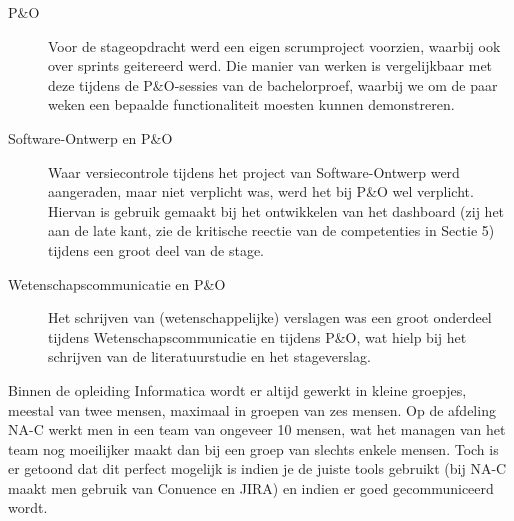 \documentclass[10pt,a4paper]{article}
\begin{document}
\begin{description}
\item[P\&O]
Voor de
stageopdracht werd een eigen scrumproject voorzien, waarbij ook over sprints
geitereerd werd. Die manier van werken is vergelijkbaar met deze tijdens de
P\&O-sessies van de bachelorproef, waarbij we om de paar weken een bepaalde
functionaliteit moesten kunnen demonstreren.

\item[Software-Ontwerp en P\&O]

Waar versiecontrole tijdens het project van Software-Ontwerp werd aangeraden,
maar niet verplicht was, werd het bij P\&O wel verplicht. Hiervan is gebruik
gemaakt bij het ontwikkelen van het dashboard (zij het aan de late kant, zie de
kritische reectie van de competenties in Sectie 5) tijdens een groot deel van de
stage.

\item[Wetenschapscommunicatie en P\&O]

Het schrijven van (wetenschappelijke) verslagen was een groot onderdeel tijdens
Wetenschapscommunicatie en tijdens P\&O, wat hielp bij het schrijven van de
literatuurstudie en het stageverslag.
\end{description}


Binnen de opleiding Informatica wordt er altijd gewerkt in kleine groepjes, meestal van twee
mensen, maximaal in groepen van zes mensen. Op de afdeling NA-C werkt men
in een team van ongeveer 10 mensen, wat het managen van het team nog moeilijker
maakt dan bij een groep van slechts enkele mensen. Toch is er getoond dat
dit perfect mogelijk is indien je de juiste tools gebruikt (bij NA-C maakt men
gebruik van Conuence en JIRA) en indien er goed gecommuniceerd wordt.
\end{document}
